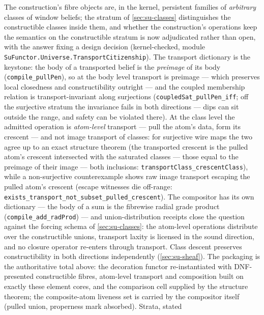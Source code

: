 \begin{remark}
\label{rem:su-transport-citizenship}
The construction's fibre objects are, in the kernel, persistent
families of \emph{arbitrary} classes of window beliefs; the
stratum of \autoref{sec:su-classes} distinguishes the
constructible classes inside them, and whether the construction's
operations keep the semantics on the constructible stratum is now
adjudicated rather than open, with the answer fixing a design
decision (kernel-checked, module
\texttt{SuFunctor.Universe.TransportCitizenship}). The transport
dictionary is the keystone: the body of a transported belief is
the \emph{preimage} of its body (\texttt{compile\_pullPen}), so at
the body level transport is preimage --- which preserves local
closedness and constructibility outright --- and the coupled
membership relation is
transport-invariant along surjections
(\texttt{coupledSat\_pullPen\_iff}; off the surjective stratum the
invariance fails in both directions --- dips can sit outside the
range, and safety can be violated there). At the
class level the admitted operation is \emph{atom-level} transport
--- pull the atom's data, form its crescent --- and not image
transport of classes: for surjective wire maps the two agree up to
an exact structure theorem (the transported crescent is the pulled
atom's crescent intersected with the saturated classes --- those
equal to the preimage of their image --- both inclusions:
\texttt{transportClass\_crescentClass}), while a
non-surjective counterexample shows raw image transport escaping
the pulled atom's crescent (escape witnesses die off-range:
\texttt{exists\_transport\_not\_subset\_pulled\_crescent}). The
compositor has its own dictionary --- the body of a sum is the
fibrewise radial grade product
(\texttt{compile\_add\_radProd}) --- and union-distribution
receipts close the question against the forcing schema of
\autoref{sec:su-classes}: the atom-level operations
distribute over the constructible unions, transport laxity is
licensed in the sound direction, and no closure operator re-enters
through transport. Class descent preserves constructibility in
both directions independently (\autoref{sec:su-sheaf}). The
packaging is the authoritative total above: the decoration
functor re-instantiated with DNF-presented constructible fibres,
atom-level transport and composition built on exactly these element
cores, and the comparison cell supplied by the structure theorem;
the composite-atom liveness set is carried by the compositor
itself (pulled union, properness mark absorbed). Strata, stated

\end{remark}
